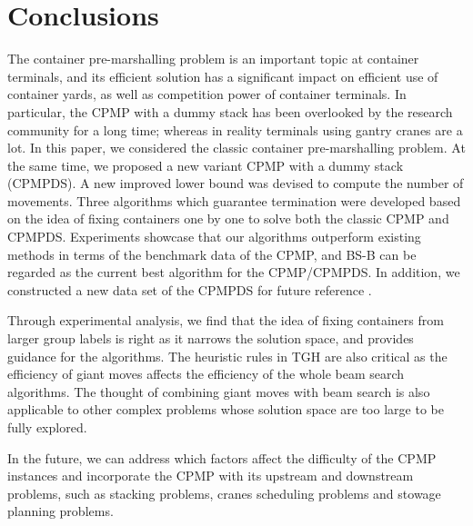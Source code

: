 \documentclass[review,3p,times,authoryear,12pt]{elsarticle}
\begin{document}
\section{Conclusions}
\label{sec:con}
The container pre-marshalling problem is an important topic at container terminals, and its efficient solution has a significant impact on efficient use of container yards, as well as competition power of container terminals. In particular, the CPMP with a dummy stack has been overlooked by the research community for a long time; whereas in reality terminals using gantry cranes are a lot.
In this paper, we considered the classic container pre-marshalling problem. At the same time, we proposed a new variant CPMP with a dummy stack (CPMPDS). A new improved lower bound was devised to compute the number of movements. Three algorithms which guarantee termination were developed based on the idea of fixing containers one by one to solve both the classic CPMP and CPMPDS. Experiments showcase that our algorithms outperform existing methods in terms of the benchmark data of the CPMP, and BS-B can be regarded as the current best algorithm for the CPMP/CPMPDS.
In addition, we constructed a new data set of the CPMPDS for future reference .

Through experimental analysis, we find that the idea of fixing containers from larger group labels is right as it narrows the solution space, and provides guidance for the algorithms. The heuristic rules in TGH are also critical as the efficiency of giant moves affects the efficiency of the whole beam search algorithms. The thought of combining giant moves with beam search is also applicable to other complex problems whose solution space are too large to be fully explored.

In the future, we can address which factors affect the difficulty of the CPMP instances and incorporate the CPMP with its upstream and downstream problems, such as stacking problems, cranes scheduling problems and stowage planning problems.






\end{document}
